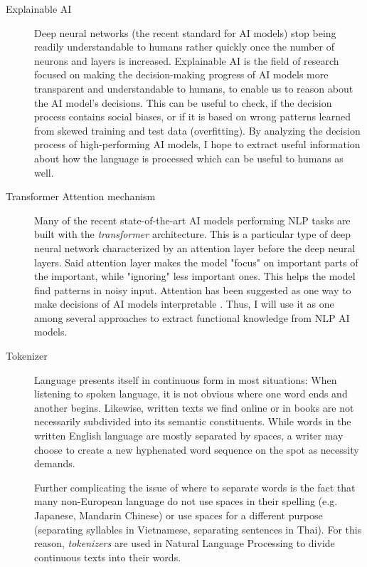 \begin{description}
	\item [Explainable AI]
	      Deep neural networks (the recent standard for AI models) stop being readily understandable to humans rather quickly once the number of neurons and layers is increased.
	      Explainable AI is the field of research focused on making the decision-making progress of AI models more transparent and understandable to humans, to enable us to reason about the AI model's decisions. 
	      This can be useful to check, if the decision process contains social biases, or if it is based on wrong patterns learned from skewed training and test data (overfitting).
	      By analyzing the decision process of high-performing AI models, I hope to extract useful information about how the language is processed which can be useful to humans as well.

	\item [Transformer Attention mechanism]
	      Many of the recent state-of-the-art AI models performing NLP tasks are built with the \textit{transformer} architecture.
	      This is a particular type of deep neural network characterized by an attention layer before the deep neural layers.
	      Said attention layer makes the model "focus" on important parts of the important, while "ignoring" less important ones.
	      This helps the model find patterns in noisy input.
	      Attention has been suggested as one way to make decisions of AI models interpretable .
		  Thus, I will use it as one among several approaches to extract functional knowledge from NLP AI models.

	\item [Tokenizer]
	      Language presents itself in continuous form in most situations:
	      When listening to spoken language, it is not obvious where one word ends and another begins.
	      Likewise, written texts we find online or in books are not necessarily subdivided into its semantic constituents.
	      While words in the written English language are mostly separated by spaces, a writer may choose to create a new hyphenated word sequence on the spot as necessity demands.

Further complicating the issue of where to separate words is the fact that many non-European language do not use spaces in their spelling (e.g. Japanese, Mandarin Chinese) or use spaces for a different purpose (separating syllables in Vietnamese, separating sentences in Thai).
	      For this reason, \textit{tokenizers} are used in Natural Language Processing to divide continuous texts into their words.


\end{description}
